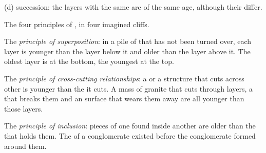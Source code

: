 \begin{omfigure}
\begin{minipage}[t]{0.49\linewidth}
{\small (d)  succession: the layers with the same  are of
the same age, although their  differ.}
\end{minipage}

\medskip
{\small The four principles of , in four imagined
cliffs.}
\label{fig:g7:geological-time:principles}
\end{omfigure}

\begin{definition}\label{def:g7:geological-time:superposition}
The \emph{principle of superposition}:
in a pile of  that has not been turned over, each layer
is younger than the layer below it and older than the layer above it.
The oldest layer is at the bottom, the youngest at the top.
\end{definition}

\begin{definition}\label{def:g7:geological-time:cross-cutting}
The \emph{principle of cross-cutting relationships}: a  or a structure that cuts across
other  is younger than the  it cuts. A mass of granite that
cuts through layers, a  that breaks them and an  surface that
wears them away are all younger than those layers.
\end{definition}

\begin{definition}\label{def:g7:geological-time:inclusion}
The \emph{principle of inclusion}: pieces of
one  found inside another  are older than the  that holds
them. The  of a conglomerate existed before the conglomerate
formed around them.
\end{definition}

